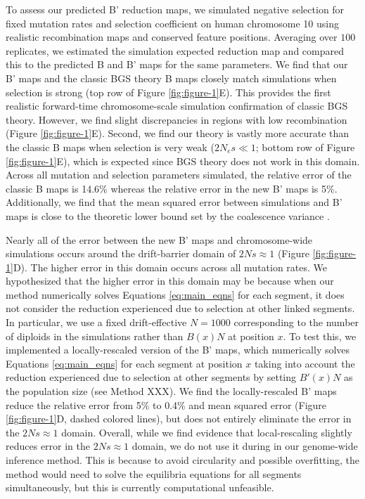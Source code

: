 \documentclass[11pt]{article}
\begin{document}
To assess our predicted B' reduction maps, we simulated negative selection for
fixed mutation rates and selection coefficient on human chromosome 10 using
realistic recombination maps and conserved feature positions. Averaging over
$100$ replicates, we estimated the simulation expected reduction map and
compared this to the predicted B and B' maps for the same parameters. We find
that our B' maps and the classic BGS theory B maps closely match simulations
when selection is strong (top row of Figure \ref{fig:figure-1}E). This provides
the first realistic forward-time chromosome-scale simulation confirmation of
classic BGS theory. However, we find slight discrepancies in regions with low
recombination (Figure \ref{fig:figure-1}E). Second, we find our theory is
vastly more accurate than the classic B maps when selection is very weak ($2N_e
s \ll 1$; bottom row of Figure \ref{fig:figure-1}E), which is expected since
BGS theory does not work in this domain. Across all mutation and selection
parameters simulated, the relative error of the classic B maps is 14.6\%
whereas the relative error in the new B' maps is 5\%. Additionally, we find
that the mean squared error between simulations and B' maps is close to the
theoretic lower bound set by the coalescence variance \parencite[see Methods
XXX]{Tajima1983-gu}.

Nearly all of the error between the new B' maps and chromosome-wide simulations
occurs around the drift-barrier domain of $2Ns \approx 1$ (Figure
\ref{fig:figure-1}D). The higher error in this domain occurs across all
mutation rates. We hypothesized that the higher error in this domain may be
because when our method numerically solves Equations \eqref{eq:main_eqns} for
each segment, it does not consider the reduction experienced due to selection
at other linked segments. In particular, we use a fixed drift-effective
$N=1000$ corresponding to the number of diploids in the simulations rather than
$B(x) N$ at position $x$. To test this, we implemented a locally-rescaled
version of the B' maps, which numerically solves Equations \eqref{eq:main_eqns}
for each segment at position $x$ taking into account the reduction experienced
due to selection at other segments by setting $B'(x)N$ as the population size
(see Method XXX). We find the locally-rescaled B' maps reduce the relative
error from 5\% to 0.4\% and mean squared error (Figure \ref{fig:figure-1}D,
dashed colored lines), but does not entirely eliminate the error in the $2Ns
\approx 1$ domain. Overall, while we find evidence that local-rescaling
slightly reduces error in the $2Ns \approx 1$ domain, we do not use it during
in our genome-wide inference method. This is because to avoid circularity and
possible overfitting, the method would need to solve the equilibria equations
for all segments simultaneously, but this is currently computational
unfeasible.
\end{document}
